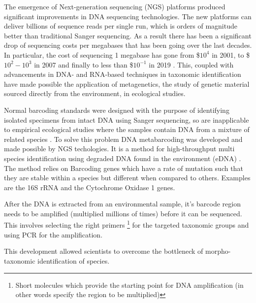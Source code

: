 The emergence of Next-generation sequencing (NGS) platforms produced significant improvements in DNA sequencing technologies. The new platforms can deliver billions of sequence reads per single run, which is orders of magnitude better than traditional Sanger sequencing. As a result there has been a significant drop of sequencing costs per megabases that has been going over the last decades. In particular, the cost of sequencing 1 megabase has gone from \$$10^4$ in 2001, to \$$10^2 - 10^3$ in 2007 and finally to less than \$$10^{-1}$ in 2019 \cite{sequencing_costs}. This, coupled with advancements in DNA- and RNA-based techniques in taxonomic identification \cite{baird_biomonitoring_2012} have made possible the application of metagenetics, the study of genetic material sourced directly from the environment, in ecological studies. 

Normal barcoding standards were designed with the purpose of identifying isolated specimens from intact DNA using Sanger sequencing, so are inapplicable to empirical ecological studies where the samples contain DNA from a mixture of related species  \cite{taberlet_towards_2012}. To solve this problem DNA metabarcoding was developed and made possible by NGS techologies. It is a method for high-throughput multi species identification using degraded DNA found in the environment (eDNA) \cite{taberlet_towards_2012}. The method relies on Barcoding genes which have a rate of mutation such that they are stable within a species but different when compared to others. Examples are the 16S rRNA and the Cytochrome Oxidase 1 \cite{hebert_paul_d._n._biological_2003} genes. 

After the DNA is extracted from an environmental sample, it's barcode region needs to be amplified (multiplied millions of times) before it can be sequenced. This involves selecting the right primers \footnote{Short molecules which provide the starting point for DNA amplification (in other words specify the region to be multiplied)} for the targeted taxonomic groups and using PCR for the amplification. 

This development allowed scientists to overcome the bottleneck of morpho-taxonomic identification of species. 

